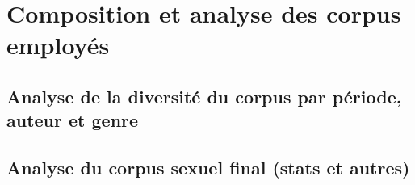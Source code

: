 

\section{Composition et analyse des corpus employés}

\subsection{Analyse de la diversité du corpus par période, auteur et genre}


\subsection{Analyse du corpus sexuel final (stats et autres)}
